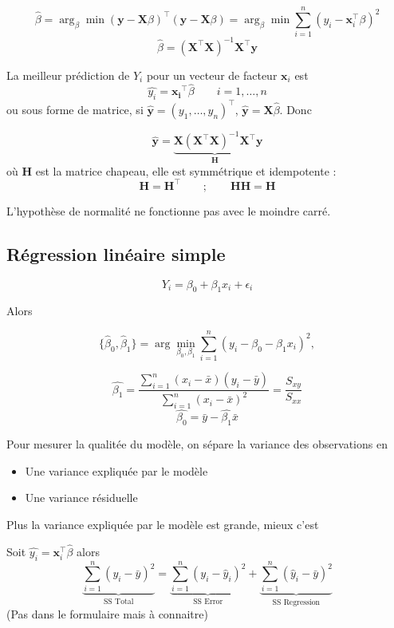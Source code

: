 \documentclass[12pt,a4paper]{article}
\begin{document}
$$\hat{\beta} = \arg_\beta \min (\mathbf{y} - \mathbf{X}\beta)^\intercal (\mathbf{y} - \mathbf{X} \beta) = \arg_\beta \min \sum_{i=1}^n (y_i - \mathbf{x}_i^\intercal \beta)^2$$
$$\hat{\beta} = (\mathbf{X}^\intercal \mathbf{X})^{-1} \mathbf{X}^\intercal \mathbf{y}$$

\bigskip

La meilleur prédiction de $Y_i$ pour un vecteur de facteur $\mathbf{x}_i$ est
$$\hat{y_i} = \mathbf{x_i}^\intercal \hat{\beta} \qquad i=1,\dots,n$$
ou sous forme de matrice, si $\hat{\mathbf{y}} = (y_1,\dots,y_n)^\intercal$, $\hat{\mathbf{y}} = \mathbf{X}\hat{\beta}$. Donc

$$\hat{\mathbf{y}} = \underbrace{\mathbf{X} (\mathbf{X}^\top \mathbf{X})^{-1} \mathbf{X}^\top}_\mathbf{H} \mathbf{y}$$
où $\mathbf{H}$ est la matrice chapeau, elle est symmétrique et idempotente :
$$\mathbf{H} = \mathbf{H}^\top \qquad ; \qquad \mathbf{H}\mathbf{H} = \mathbf{H}$$

L'hypothèse de normalité ne fonctionne pas avec le moindre carré.


\subsection{Régression linéaire simple}

$$Y_i = \beta_0 + \beta_1 x_i + \epsilon_i$$

Alors

$$\{\hat{\beta}_0, \hat{\beta}_1\} = \operatorname{arg}\min_{\beta_0, \beta_1} \sum_{i=1}^{n} (y_i - \beta_0 - \beta_1 x_i)^2 ,$$

$$\hat{\beta_1} = \frac{{\sum_{i=1}^{n} (x_i-\bar{x})(y_i-\bar{y})}}{{\sum_{i=1}^{n} (x_i-\bar{x})^2}} = \frac{{S_{xy}}}{{S_{xx}}}$$
$$\hat{\beta_0} = \bar{y} - \hat{\beta_1}\bar{x}$$

Pour mesurer la qualitée du modèle, on sépare la variance des observations en 
\begin{itemize}
    \item Une variance expliquée par le modèle
    \item Une variance résiduelle
\end{itemize}

Plus la variance expliquée par le modèle est grande, mieux c'est

Soit $\hat{y_i} = \mathbf{x}_i^\top \hat{\beta}$ alors
$$\underbrace{\sum_{i=1}^{n} (y_i - \bar{y})^2}_{\text{SS Total}} = \underbrace{\sum_{i=1}^{n} (y_i - \hat{y}_i)^2}_{\text{SS Error}} + \underbrace{\sum_{i=1}^{n} (\hat{y}_i - \bar{y})^2}_{\text{SS Regression}}$$
(Pas dans le formulaire mais à connaitre)
\end{document}
